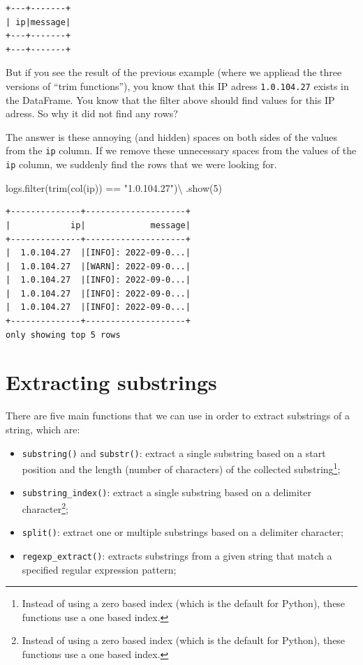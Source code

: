 \documentclass[
  11pt,
  letterpaper,
  DIV=11,
  numbers=noendperiod]{scrreprt}
\newenvironment{Shaded}{\begin{snugshade}}{\end{snugshade}}
\newcommand{\BuiltInTok}[1]{\textcolor[rgb]{0.00,0.23,0.31}{#1}}
\newcommand{\DecValTok}[1]{\textcolor[rgb]{0.68,0.00,0.00}{#1}}
\newcommand{\NormalTok}[1]{\textcolor[rgb]{0.00,0.23,0.31}{#1}}
\newcommand{\OperatorTok}[1]{\textcolor[rgb]{0.37,0.37,0.37}{#1}}
\newcommand{\StringTok}[1]{\textcolor[rgb]{0.13,0.47,0.30}{#1}}
\providecommand{\tightlist}{%
  \setlength{\itemsep}{0pt}\setlength{\parskip}{0pt}}\usepackage{longtable,booktabs,array}
\begin{document}
\begin{verbatim}
+---+-------+
| ip|message|
+---+-------+
+---+-------+
\end{verbatim}

But if you see the result of the previous example (where we appliead the
three versions of ``trim functions''), you know that this IP adress
\texttt{1.0.104.27} exists in the DataFrame. You know that the filter
above should find values for this IP adress. So why it did not find any
rows?

The answer is these annoying (and hidden) spaces on both sides of the
values from the \texttt{ip} column. If we remove these unnecessary
spaces from the values of the \texttt{ip} column, we suddenly find the
rows that we were looking for.

\begin{Shaded}
\begin{Highlighting}[]
\NormalTok{logs.}\BuiltInTok{filter}\NormalTok{(trim(col(}\StringTok{\textquotesingle{}ip\textquotesingle{}}\NormalTok{)) }\OperatorTok{==} \StringTok{"1.0.104.27"}\NormalTok{)}\OperatorTok{\textbackslash{}}
\NormalTok{    .show(}\DecValTok{5}\NormalTok{)}
\end{Highlighting}
\end{Shaded}

\begin{verbatim}
+--------------+--------------------+
|            ip|             message|
+--------------+--------------------+
|  1.0.104.27  |[INFO]: 2022-09-0...|
|  1.0.104.27  |[WARN]: 2022-09-0...|
|  1.0.104.27  |[INFO]: 2022-09-0...|
|  1.0.104.27  |[INFO]: 2022-09-0...|
|  1.0.104.27  |[INFO]: 2022-09-0...|
+--------------+--------------------+
only showing top 5 rows
\end{verbatim}

\section{Extracting substrings}\label{extracting-substrings}

There are five main functions that we can use in order to extract
substrings of a string, which are:

\begin{itemize}
\tightlist
\item
  \texttt{substring()} and \texttt{substr()}: extract a single substring
  based on a start position and the length (number of characters) of the
  collected substring\footnote{Instead of using a zero based index
    (which is the default for Python), these functions use a one based
    index.};
\item
  \texttt{substring\_index()}: extract a single substring based on a
  delimiter character\footnote{Instead of using a zero based index
    (which is the default for Python), these functions use a one based
    index.};
\item
  \texttt{split()}: extract one or multiple substrings based on a
  delimiter character;
\item
  \texttt{regexp\_extract()}: extracts substrings from a given string
  that match a specified regular expression pattern;
\end{itemize}
\end{document}
